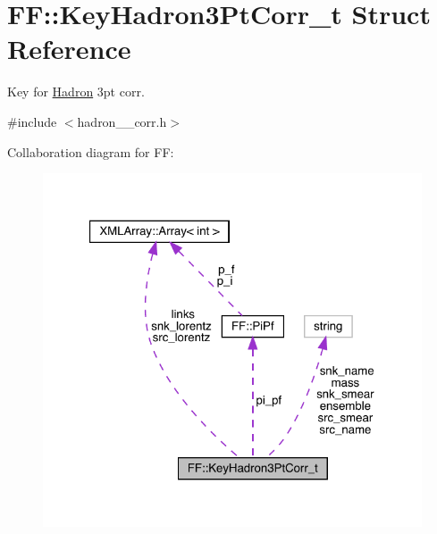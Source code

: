 \hypertarget{structFF_1_1KeyHadron3PtCorr__t}{}\section{FF\+:\+:Key\+Hadron3\+Pt\+Corr\+\_\+t Struct Reference}
\label{structFF_1_1KeyHadron3PtCorr__t}


Key for \mbox{\hyperlink{namespaceHadron}{Hadron}} 3pt corr.  




{\ttfamily \#include $<$hadron\+\_\+3pt\+\_\+corr.\+h$>$}



Collaboration diagram for FF\+:\nopagebreak
\begin{figure}[H]
\begin{center}
\leavevmode
\includegraphics[width=321pt]{d8/d3d/structFF_1_1KeyHadron3PtCorr__t__coll__graph}
\end{center}
\end{figure}
